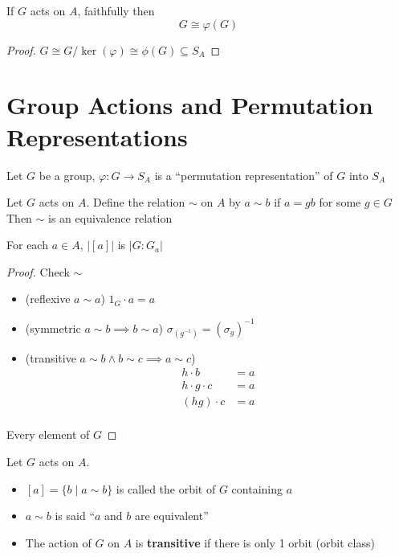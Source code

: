 \begin{observation}
  If $G$ acts on $A$, faithfully then
  \[G \cong \varphi(G)\]
\end{observation}

\begin{proof}
  $G \cong G/\ker(\varphi) \cong \phi(G) \subseteq S_A$
\end{proof}


\section{Group Actions and Permutation Representations}

\begin{definition}
  Let $G$ be a group, $\varphi: G \to S_A$ is a ``permutation representation'' of $G$ into $S_A$
\end{definition}

\begin{proposition}
  Let $G$ acts on $A$. Define the relation $\sim$ on $A$ by
  $a \sim b$ if $a = gb$ for some $g\in G$
  Then $\sim$ is an equivalence relation

  For each $a \in A$, $|[a]|$ is $|G : G_a|$
\end{proposition}

\begin{proof}
  Check $\sim$
  \begin{itemize}
    \item (reflexive $a \sim a$) $1_G\cdot a = a$
    \item (symmetric $a \sim b \implies b \sim a$) $\sigma_(g^{-1}) = (\sigma_g)^{-1}$
    \item (transitive $a \sim b \land b \sim c \implies a \sim c$) 
    \begin{align*}
      h\cdot b &= a \\
      h\cdot g\cdot c &= a \\
      (hg)\cdot c &= a \\
    \end{align*}
  \end{itemize}

  Every element of $G$  
\end{proof}

\begin{definition}
  Let $G$ acts on $A$. 
  \begin{itemize}
    \item $[a] = \{b \mid a \sim b\}$ is called the orbit of $G$ containing $a$
    \item $a \sim b$ is said ``$a$ and $b$ are equivalent''
    \item The action of $G$ on $A$ is \textbf{transitive} if there is only 1 orbit (orbit class)
  \end{itemize}
\end{definition}


